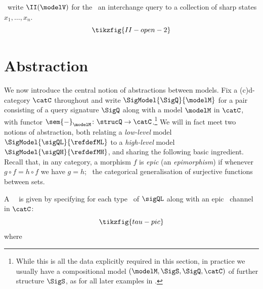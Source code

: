\documentclass{article}
\begin{document}
\ write $\II(\modelV)$ 
for the \ an interchange query to a collection of sharp states $x_1, \dots, x_n$. 
\[
\tikzfig{II-open-2} 
\]


\section{Abstraction} \label{sec:abstraction}

We now introduce the central notion of abstractions between models. Fix a (c)d-category $\catC$ throughout and write $\SigModel{\SigQ}{\modelM}$ for a pair consisting of a query signature $\SigQ$ along with a model $\modelM$ in $\catC$, with functor $\sem{-}_\modelM \colon \strucQ \to \catC$.\footnote{While this is all the data explicitly required in this section, in practice we usually have a compositional model $(\modelM,\SigS, \SigQ, \catC)$ of further structure $\SigS$, as for all later examples in .} We will in fact meet two notions of abstraction, both relating a \emph{low-level} model $\SigModel{\sigQL}{\refdefML}$ to a \emph{high-level} model ${\SigModel{\sigQH}{\refdefMH}}$, and sharing the following basic ingredient. 
Recall that, in any category, a morphism $f$ is \emph{epic} (an \emph{epimorphism}) if whenever $g \circ f = h \circ f$ we have $g = h$; \ the categorical generalisation of surjective functions between sets. 


\begin{definition}[\typedowncaps] 
A \rl{\emph{\typedownfull{}}}\ 
\
is given by specifying for each type \ of $\sigQL$ along with an epic \ channel in $\catC$: 
\begin{equation} \label{eq:tau-one}
\tikzfig{tau-pic}
\end{equation}
where  
\end{definition}
\end{document}
